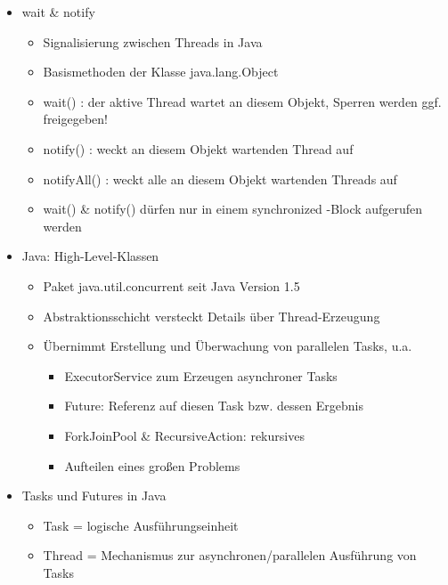 \documentclass[10pt]{article}
\begin{document}
\begin{itemize}
\begin{itemize}
\begin{itemize}
\begin{itemize}
                        \end{itemize}
                \end{itemize}
          \item wait \& notify
                \begin{itemize}
                  \item  Signalisierung zwischen Threads in Java
                  \item Basismethoden der Klasse java.lang.Object
                  \item wait() : der aktive Thread wartet an diesem Objekt, Sperren werden ggf. freigegeben!
                  \item notify() : weckt an diesem Objekt wartenden Thread auf
                  \item notifyAll() : weckt alle an diesem Objekt wartenden Threads auf
                  \item wait() \& notify() dürfen nur in einem synchronized -Block aufgerufen werden
                \end{itemize}
          \item Java: High-Level-Klassen
                \begin{itemize}
                  \item Paket java.util.concurrent seit Java Version 1.5
                  \item Abstraktionsschicht versteckt Details über Thread-Erzeugung
                  \item Übernimmt Erstellung und Überwachung von parallelen Tasks, u.a.
                        \begin{itemize}
                          \item ExecutorService zum Erzeugen asynchroner Tasks
                          \item Future: Referenz auf diesen Task bzw. dessen Ergebnis
                          \item ForkJoinPool \& RecursiveAction: rekursives
                          \item Aufteilen eines großen Problems
                        \end{itemize}
                \end{itemize}
          \item Tasks und Futures in Java
                \begin{itemize}
                  \item Task = logische Ausführungseinheit
                  \item Thread = Mechanismus zur asynchronen/parallelen Ausführung von Tasks

\end{itemize}
\end{itemize}
\end{itemize}
\end{document}
